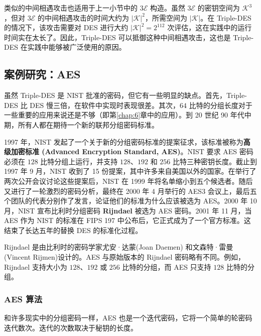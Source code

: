 \begin{snote}
类似的中间相遇攻击也适用于上一小节中的 $3\mathcal{E}$ 构造。虽然 $3\mathcal{E}$ 的密钥空间为 $\mathcal{K}^3$，但对 $3\mathcal{E}$ 的中间相遇攻击的时间大约为 $|\mathcal{K}|^2$，所需空间为 $|\mathcal{K}|$。在 Triple-DES 的情况下，该攻击需要对 DES 进行大约 $|\mathcal{K}|^2=2^{112}$ 次评估，这在实践中的运行时间实在太长了。因此，Triple-DES 可以抵御这种中间相遇攻击，这也是 Triple-DES 在实践中能够被广泛使用的原因。
\end{snote}

\subsection{案例研究：AES}

虽然 Triple-DES 是 NIST 批准的密码，但它有一些明显的缺点。首先，Triple-DES 比 DES 慢三倍，在软件中实现时表现很差。其次，$64$ 比特的分组长度对于一些重要的应用来说还是不够（即第\ref{chap:6}章中的应用）。到 20 世纪 90 年代中期，所有人都在期待一个新的联邦分组密码标准。

\begin{snote}[AES的历程。]
1997 年，NIST 发起了一个关于新的分组密码标准的提案征求，该标准被称为\textbf{高级加密标准 (Advanced Encryption Standard, AES)}。NIST 要求 AES 密码必须在 $128$ 比特分组上运行，并支持 $128$、$192$ 和 $256$ 比特三种密钥长度。截止到 1997 年 9 月，NIST 收到了 15 份提案，其中许多来自美国以外的国家。在举行了两次公开会议讨论这些提案后，NIST 在 1999 年将名单缩小到五个候选者。随后又进行了一轮激烈的密码分析，最终在 2000 年 4 月举行的 AES3 会议上，最后五个团队的代表分别作了发言，论证他们的标准为什么应该被选为 AES。2000 年 10 月，NIST 宣布比利时分组密码 \textbf{Rijndael} 被选为 AES 密码。2001 年 11 月，当 AES 作为 NIST 的标准在 FIPS 197 中公布后，它正式成为了一个官方标准。这结束了长达五年的替换 DES 的标准化过程。

Rijndael 是由比利时的密码学家尤安·达蒙(Joan Daemen) 和文森特·雷曼(Vincent Rijmen)设计的。AES 与原始版本的 Rijndael 密码略有不同。例如，Rijndael 支持大小为 $128$、$192$ 或 $256$ 比特的分组，而 AES 只支持 $128$ 比特的分组。
\end{snote}

\subsubsection{AES 算法}

和许多现实中的分组密码一样，AES 也是一个迭代密码，它将一个简单的轮密码迭代数次。迭代的次数取决于秘钥的长度。

